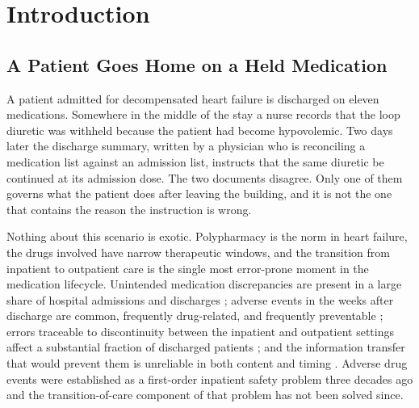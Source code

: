 %
%

\chapter{Introduction}
\label{ch:intro}

\section{A Patient Goes Home on a Held Medication}
\label{sec:intro-problem}

A patient admitted for decompensated heart failure is discharged on eleven
medications. Somewhere in the middle of the stay a nurse records that the loop
diuretic was withheld because the patient had become hypovolemic. Two days
later the discharge summary, written by a physician who is reconciling a
medication list against an admission list, instructs that the same diuretic be
continued at its admission dose. The two documents disagree. Only one of them
governs what the patient does after leaving the building, and it is not the one
that contains the reason the instruction is wrong.

Nothing about this scenario is exotic. Polypharmacy is the norm in heart
failure, the drugs involved have narrow therapeutic windows, and the transition
from inpatient to outpatient care is the single most error-prone moment in the
medication lifecycle. Unintended medication discrepancies are present in a
large share of hospital admissions \citep{cornish2005discrepancies} and
discharges \citep{wong2008reconciliation}; adverse events in the weeks after
discharge are common, frequently drug-related, and frequently preventable
\citep{forster2003adverse}; errors traceable to discontinuity between the
inpatient and outpatient settings affect a substantial fraction of discharged
patients \citep{moore2003discontinuity}; and the information transfer that
would prevent them is unreliable in both content and timing
\citep{kripalani2007deficits}. Adverse drug events were established as a
first-order inpatient safety problem three decades ago
\citep{bates1995ade} and the transition-of-care component of that problem has
not been solved since.

